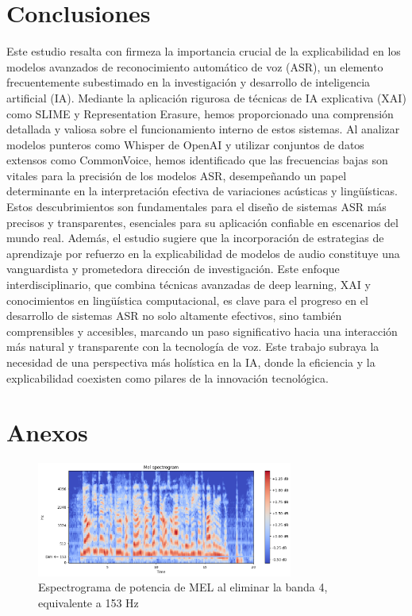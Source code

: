 \documentclass[conference]{IEEEtran}
\begin{document}
\section{Conclusiones} \label{8-Conclusions}
Este estudio resalta con firmeza la importancia crucial de la explicabilidad en los modelos avanzados de reconocimiento automático de voz (ASR), un elemento frecuentemente subestimado en la investigación y desarrollo de inteligencia artificial (IA). 
Mediante la aplicación rigurosa de técnicas de IA explicativa (XAI) como SLIME y Representation Erasure, hemos proporcionado una comprensión detallada y valiosa sobre el funcionamiento interno de estos sistemas.
Al analizar modelos punteros como Whisper de OpenAI y utilizar conjuntos de datos extensos como CommonVoice, hemos identificado que las frecuencias bajas son vitales para la precisión de los modelos ASR, desempeñando un papel determinante en la interpretación efectiva de variaciones acústicas y lingüísticas. 
Estos descubrimientos son fundamentales para el diseño de sistemas ASR más precisos y transparentes, esenciales para su aplicación confiable en escenarios del mundo real. 
Además, el estudio sugiere que la incorporación de estrategias de aprendizaje por refuerzo en la explicabilidad de modelos de audio constituye una vanguardista y prometedora dirección de investigación. 
Este enfoque interdisciplinario, que combina técnicas avanzadas de deep learning, XAI y conocimientos en lingüística computacional, es clave para el progreso en el desarrollo de sistemas ASR no solo altamente efectivos, sino también comprensibles y accesibles, marcando un paso significativo hacia una interacción más natural y transparente con la tecnología de voz. 
Este trabajo subraya la necesidad de una perspectiva más holística en la IA, donde la eficiencia y la explicabilidad coexisten como pilares de la innovación tecnológica.

\printbibliography

\section{Anexos} \label{9-Anexos}
\begin{figure}[h]
\centering
\includegraphics[width=0.75\textwidth]{images/dim_4_erasured.png}
\caption{Espectrograma de potencia de MEL al eliminar la banda 4, equivalente a 153 Hz}
\end{figure}
\end{document}
